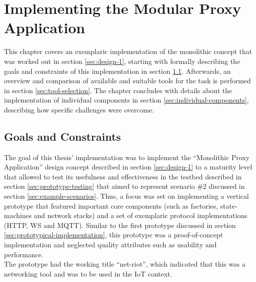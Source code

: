 \chapter{Implementing the Modular Proxy Application}
\label{chap:implementation}
This chapter covers an exemplaric implementation of the monolithic concept that was worked out in section \ref{sec:design-1}, starting with formally describing the goals and constraints of this implementation in section \ref{sec:goals-constraints}. Afterwards, an overview and comparison of available and suitable tools for the task is performed in section \ref{sec:tool-selection}. The chapter concludes with details about the implementation of individual components in section \ref{sec:individual-components}, describing how specific challenges were overcome.

\section{Goals and Constraints}
\label{sec:goals-constraints}
The goal of this thesis' implementation was to implement the \enquote{Monolithic Proxy Application} design concept described in section \ref{sec:design-1} to a maturity level that allowed to test its usefulness and effectiveness in the testbed described in section \ref{sec:prototype-testing} that aimed to represent scenario \#2 discussed in section \ref{sec:example-scenarios}. Thus, a focus was set on implementing a vertical prototype that featured important core components (such as factories, state-machines and network stacks) and a set of exemplaric protocol implementations (\ac{HTTP}, \ac{WS} and \ac{MQTT}). Similar to the first prototype discussed in section \ref{sec:prototypical-implementation}, this prototype was a proof-of-concept implementation and neglected quality attributes such as usability and performance.\\
The prototype had the working title \enquote{net-riot}, which indicated that this was a networking tool and was to be used in the \ac{IoT} context.

